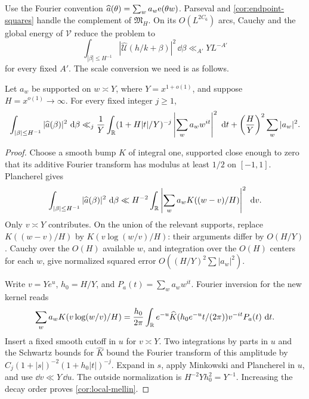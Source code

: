 Use the Fourier convention
$\widehat a(\theta)=\sum_w a_w\mathrm{e}(\theta w)$.
Parseval and \eqref{cor:endpoint-squares} handle the complement of
$\mathfrak M_H$.  On its $O(L^{2C_6})$ arcs, Cauchy and the global
energy of $\mathcal V$ reduce the problem to
\begin{equation}\label{cor:arc-energy-target}
 \int_{|\beta|\leq H^{-1}}
     |\widehat{\mathcal U}(h/k+\beta)|^2\,\dd\beta
       \ll_{A'}YL^{-A'}
\end{equation}
for every fixed $A'$.  The scale conversion we need is as follows.

\begin{lemma}\label{lem:local-mellin}
Let $a_w$ be supported on $w\asymp Y$, where $Y=x^{1+o(1)}$,
and suppose $H=x^{o(1)}\to\infty$.  For every fixed integer $j\geq1$,
\begin{equation}\label{cor:local-mellin}
 \int_{|\beta|\leq H^{-1}}|\widehat a(\beta)|^2\,\,\mathrm d\beta
 \ll_j\frac1Y\int_{\mathbb R}(1+H|t|/Y)^{-j}
       \left|\sum_w a_ww^{it}\right|^2\,\,\mathrm d t
       +\left(\frac HY\right)^2\sum_w|a_w|^2.
\end{equation}
\end{lemma}

\begin{proof}
Choose a smooth bump $K$ of
integral one, supported close enough to zero that its additive Fourier
transform has modulus at least $1/2$ on $[-1,1]$.  Plancherel gives
\[
 \int_{|\beta|\leq H^{-1}}|\widehat a(\beta)|^2\,\,\mathrm d\beta
 \ll H^{-2}\int_\mathbb R
       \left|\sum_w a_wK((w-v)/H)\right|^2\,\,\mathrm d v.
\]
Only $v\asymp Y$ contributes.  On the union of the relevant supports,
replace $K((w-v)/H)$ by $K(v\log(w/v)/H)$: their arguments differ
by $O(H/Y)$.  Cauchy over the $O(H)$ available $w$, and integration
over the $O(H)$ centers for each $w$, give normalized squared error
$O((H/Y)^2\sum|a_w|^2)$.

Write $v=Ye^u$, $h_0=H/Y$, and $P_a(t)=\sum_w a_ww^{it}$.
Fourier inversion for the new kernel reads
\[
 \sum_w a_wK(v\log(w/v)/H)
 =\frac{h_0}{2\pi}\int_\mathbb R e^{-u}
      \widehat K(h_0e^{-u}t/(2\pi))v^{-it}P_a(t)\,\,\mathrm d t.
\]
Insert a fixed smooth cutoff in $u$ for $v\asymp Y$.  Two
integrations by parts in $u$ and the Schwartz bounds for $\widehat K$
bound the Fourier transform of this amplitude by
$C_j(1+|s|)^{-2}(1+h_0|t|)^{-j}$.  Expand in $s$, apply Minkowski
and Plancherel in $u$, and use $\dd v\ll Y\,\dd u$.  The outside
normalization is $H^{-2}Yh_0^2=Y^{-1}$.  Increasing the decay order
proves \eqref{cor:local-mellin}.
\end{proof}

